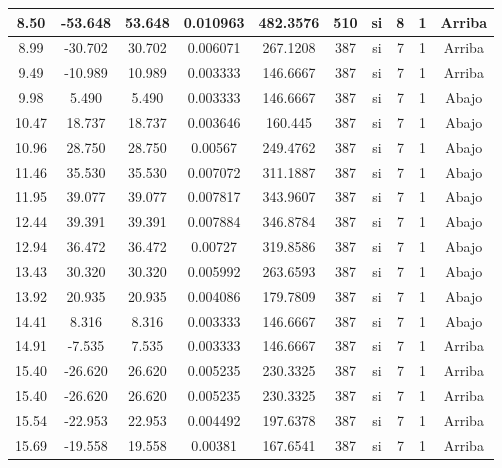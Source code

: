 \begin{table}[H]
{\begin{tabular}{|c|c|c|c|c|c|c|c|c|c|}
    \hline
    8.50 & -53.648 & 53.648 & 0.010963 & 482.3576 & 510 & si  & 8   & 1   & Arriba \bigstrut\\
    \hline
    8.99 & -30.702 & 30.702 & 0.006071 & 267.1208 & 387 & si  & 7   & 1   & Arriba \bigstrut\\
    \hline
    9.49 & -10.989 & 10.989 & 0.003333 & 146.6667 & 387 & si  & 7   & 1   & Arriba \bigstrut\\
    \hline
    9.98 & 5.490 & 5.490 & 0.003333 & 146.6667 & 387 & si  & 7   & 1   & Abajo \bigstrut\\
    \hline
    10.47 & 18.737 & 18.737 & 0.003646 & 160.445 & 387 & si  & 7   & 1   & Abajo \bigstrut\\
    \hline
    10.96 & 28.750 & 28.750 & 0.00567 & 249.4762 & 387 & si  & 7   & 1   & Abajo \bigstrut\\
    \hline
    11.46 & 35.530 & 35.530 & 0.007072 & 311.1887 & 387 & si  & 7   & 1   & Abajo \bigstrut\\
    \hline
    11.95 & 39.077 & 39.077 & 0.007817 & 343.9607 & 387 & si  & 7   & 1   & Abajo \bigstrut\\
    \hline
    12.44 & 39.391 & 39.391 & 0.007884 & 346.8784 & 387 & si  & 7   & 1   & Abajo \bigstrut\\
    \hline
    12.94 & 36.472 & 36.472 & 0.00727 & 319.8586 & 387 & si  & 7   & 1   & Abajo \bigstrut\\
    \hline
    13.43 & 30.320 & 30.320 & 0.005992 & 263.6593 & 387 & si  & 7   & 1   & Abajo \bigstrut\\
    \hline
    13.92 & 20.935 & 20.935 & 0.004086 & 179.7809 & 387 & si  & 7   & 1   & Abajo \bigstrut\\
    \hline
    14.41 & 8.316 & 8.316 & 0.003333 & 146.6667 & 387 & si  & 7   & 1   & Abajo \bigstrut\\
    \hline
    14.91 & -7.535 & 7.535 & 0.003333 & 146.6667 & 387 & si  & 7   & 1   & Arriba \bigstrut\\
    \hline
    15.40 & -26.620 & 26.620 & 0.005235 & 230.3325 & 387 & si  & 7   & 1   & Arriba \bigstrut\\
    \hline
    15.40 & -26.620 & 26.620 & 0.005235 & 230.3325 & 387 & si  & 7   & 1   & Arriba \bigstrut\\
    \hline
    15.54 & -22.953 & 22.953 & 0.004492 & 197.6378 & 387 & si  & 7   & 1   & Arriba \bigstrut\\
    \hline
    15.69 & -19.558 & 19.558 & 0.00381 & 167.6541 & 387 & si  & 7   & 1   & Arriba \bigstrut\\

\end{tabular}}
\end{table}
